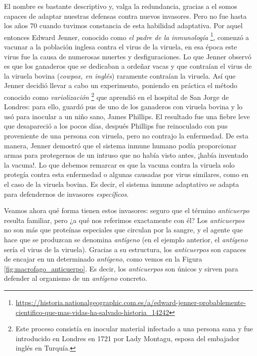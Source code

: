 El nombre es bastante descriptivo y, valga la redundancia, gracias a el somos capaces de adaptar nuestras defensas contra nuevos invasores. Pero no fue hasta los años 70 cuando tuvimos constancia de esta habilidad adaptativa. Por aquel entonces Edward Jenner, conocido como \textit{el padre de la inmunología} \footnote{\url{https://historia.nationalgeographic.com.es/a/edward-jenner-probablemente-cientifico-que-mas-vidas-ha-salvado-historia_14242}}, comenzó a vacunar a la población inglesa contra el virus de la viruela, en esa época este virus fue la causa de numerosas muertes y desfiguraciones. Lo que Jenner observó es que los ganaderos que se dedicaban a ordeñar vacas y que contraían el virus de la viruela bovina (\textit{cowpox, en inglés}) raramente contraían la viruela. Así que Jenner decidió llevar a cabo un experimento, poniendo en práctica el método conocido como \textit{variolización} \footnote{Este proceso consistía en inocular material infectado a una persona sana y fue introducido en Londres en 1721 por  Lady Montagu, esposa del embajador inglés en Turquía.} que aprendió en el hospital de San Jorge de Londres: para ello, guardó pus de uno de los ganaderos con viruela bovina y lo usó para inocular a un niño sano, James Phillips. El resultado fue una fiebre leve que desapareció a los pocos días, después Phillips fue reinoculado con pus proveniente de una persona con viruela, pero no contrajo la enfermedad. De esta manera, Jenner demostró que el sistema inmune humano podía proporcionar armas para protegernos de un intruso que no había visto antes, ¡había inventado la vacuna!. Lo que debemos remarcar es que la vacuna contra la viruela solo protegía contra esta enfermedad o algunas causadas por virus similares, como en el caso de la viruela bovina. Es decir, el sistema inmune adaptativo se adapta para defendernos de invasores \textit{específicos}. 

Veamos ahora qué forma tienen estos invasores: seguro que el término \textit{anticuerpo} resulta familiar, pero ¿a qué nos referimos exactamente con él? Los \textit{anticuerpos} no son más que proteínas especiales que circulan por la sangre, y el agente que hace que se produzcan se denomina \textit{antígeno} (en el ejemplo anterior, el \textit{antígeno} sería el virus de la viruela). Gracias a su estructura, los \textit{anticuerpos} son capaces de encajar en un determinado \textit{antígeno}, como vemos en la Figura \ref{fig:macrofago_anticuerpo}. Es decir, los \textit{anticuerpos} son únicos y sirven para defender al organismo de un \textit{antígeno} concreto.

